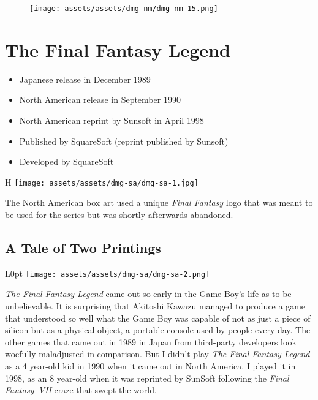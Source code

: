 \documentclass{book}
\begin{document}
\begin{figure}[hbt]
\vskip 10pt
\centering \texttt{[image: assets/assets/dmg-nm/dmg-nm-15.png]}
\vskip 6pt
\end{figure}


\begingroup \chapter*{The Final Fantasy Legend} \endgroup

\begin{itemize} \setlength\itemsep{-0.4em}
\item Japanese release in December 1989
\item North American release in September 1990
\item North American reprint by Sunsoft in April 1998
\item Published by SquareSoft (reprint published by Sunsoft)
\item Developed by SquareSoft
\end{itemize}\noindent

\begin{wrapfigure}{H}{\linewidth}
\vskip 4pt
\centering \texttt{[image: assets/assets/dmg-sa/dmg-sa-1.jpg]}\par\pagetwodescription The North American box art used a unique \emph{Final Fantasy} logo that was meant to be used for the series but was shortly afterwards abandoned.\end{wrapfigure}
\clearpage

\FloatBarrier\needspace{5pt}\section*{A Tale of Two Printings}\nopagebreak[4]

\begin{wrapfigure}{L}{0pt} \texttt{[image: assets/assets/dmg-sa/dmg-sa-2.png]}\end{wrapfigure}
\emph{The Final Fantasy Legend} came out so early in the Game Boy’s life as to be unbelievable. It is surprising that Akitoshi Kawazu managed to produce a game that understood so well what the Game Boy was capable of not as just a piece of silicon but as a physical object, a portable console used by people every day. The other games that came out in 1989 in Japan from third-party developers look woefully maladjusted in comparison. But I didn’t play \emph{The Final Fantasy Legend} as a 4 year-old kid in 1990 when it came out in North America. I played it in 1998, as an 8 year-old when it was reprinted by SunSoft following the \emph{Final Fantasy VII} craze that swept the world.
\end{document}

